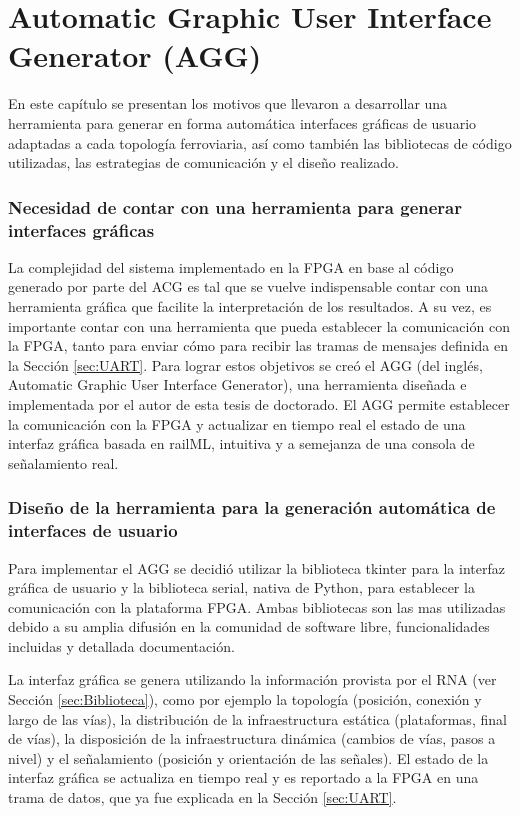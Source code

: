 \chapter{Automatic Graphic User Interface Generator (AGG)}
	\label{sec:AGG}
	
	En este capítulo se presentan los motivos que llevaron a desarrollar una herramienta para generar en forma automática interfaces gráficas de usuario adaptadas a cada topología ferroviaria, así como también las bibliotecas de código utilizadas, las estrategias de comunicación y el diseño realizado.
	
	\subsection{Necesidad de contar con una herramienta para generar interfaces gráficas}
	
	La complejidad del sistema implementado en la FPGA en base al código generado por parte del ACG es tal que se vuelve indispensable contar con una herramienta gráfica que facilite la interpretación de los resultados. A su vez, es importante contar con una herramienta que pueda establecer la comunicación con la FPGA, tanto para enviar cómo para recibir las tramas de mensajes definida en la Sección \ref{sec:UART}. Para lograr estos objetivos se creó el AGG (del inglés, Automatic Graphic User Interface Generator), una herramienta diseñada e implementada por el autor de esta tesis de doctorado. El AGG permite establecer la comunicación con la FPGA y actualizar en tiempo real el estado de una interfaz gráfica basada en railML, intuitiva y a semejanza de una consola de señalamiento real.
	
	\subsection{Diseño de la herramienta para la generación automática de interfaces de usuario}
	
	Para implementar el AGG se decidió utilizar la biblioteca tkinter \cite{TKINTER} para la interfaz gráfica de usuario y la biblioteca serial, nativa de Python, para establecer la comunicación con la plataforma FPGA. Ambas bibliotecas son las mas utilizadas debido a su amplia difusión en la comunidad de software libre, funcionalidades incluidas y detallada documentación.
	
	La interfaz gráfica se genera utilizando la información provista por el RNA (ver Sección \ref{sec:Biblioteca}), como por ejemplo la topología (posición, conexión y largo de las vías), la distribución de la infraestructura estática (plataformas, final de vías), la disposición de la infraestructura dinámica (cambios de vías, pasos a nivel) y el señalamiento (posición y orientación de las señales). El estado de la interfaz gráfica se actualiza en tiempo real y es reportado a la FPGA en una trama de datos, que ya fue explicada en la Sección \ref{sec:UART}.
	
